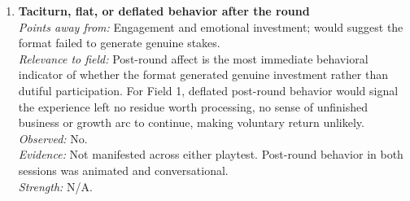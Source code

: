 \documentclass[12pt]{article}
\begin{document}
\begin{enumerate}

\item \textbf{Taciturn, flat, or deflated behavior after the round}\\
\textit{Points away from:} Engagement and emotional investment; would suggest the format failed to generate genuine stakes.\\
\textit{Relevance to field:} Post-round affect is the most immediate behavioral indicator of whether the format generated genuine investment rather than dutiful participation. For Field 1, deflated post-round behavior would signal the experience left no residue worth processing, no sense of unfinished business or growth arc to continue, making voluntary return unlikely.\\
\textit{Observed:} No.\\
\textit{Evidence:} Not manifested across either playtest. Post-round behavior in both sessions was animated and conversational.\\
\textit{Strength:} N/A.


\end{enumerate}
\end{document}
